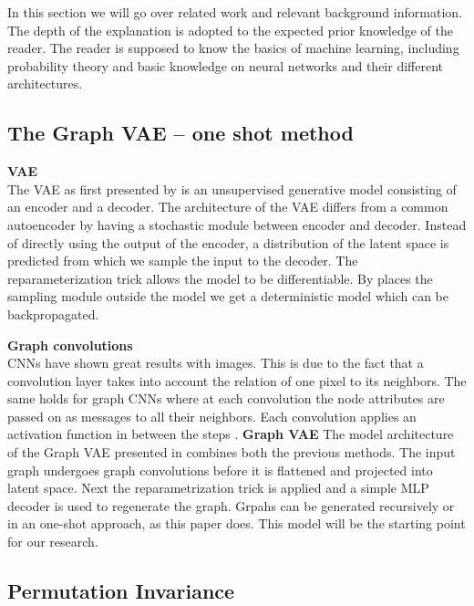 In this section we will go over related work and relevant background information. The depth of the explanation is adopted to the expected prior knowledge of the reader. The reader is supposed to know the basics of machine learning, including probability theory and basic knowledge on neural networks and their different architectures.

\subsection{The Graph VAE – one shot method}

\textbf{VAE}\\
The VAE as first presented by \cite{kingma_auto-encoding_2014} is an unsupervised generative model consisting of an encoder and a decoder. The architecture of the VAE differs from a common autoencoder by having a stochastic module between encoder and decoder. Instead of directly using the output of the encoder, a distribution of the latent space is predicted from which we sample the input to the decoder. The reparameterization trick allows the model to be differentiable. By places the sampling module outside the model we get a deterministic model which can be backpropagated.

\textbf{Graph convolutions}\\
CNNs have shown great results with images. This is due to the fact that a convolution layer takes into account the relation of one pixel to its neighbors. The same holds for graph CNNs where at each convolution the node attributes are passed on as messages to all their neighbors. Each convolution applies an activation function in between the steps \cite{tiao_variational_nodate}. 
\textbf{Graph VAE}
The model architecture of the Graph VAE presented in \cite{simonovsky_graphvae_2018} combines both the previous methods. The input graph undergoes graph convolutions before it is flattened and projected into latent space. Next the reparametrization trick is applied and a simple MLP decoder is used to regenerate the graph.
Grpahs can be generated recursively or in an one-shot approach, as this paper does.
This model will be the starting point for our research.




\subsection{Permutation Invariance}

